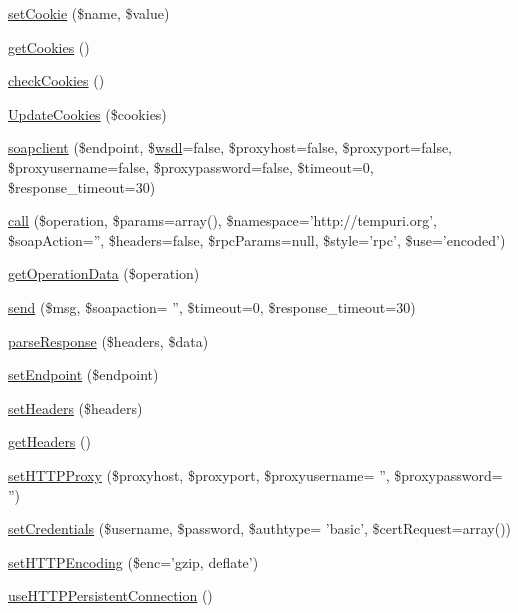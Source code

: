 \begin{DoxyCompactItemize}
\item 
\hyperlink{classsoapclient_a3f05f631ff936a033cae038052d9e7f9}{set\-Cookie} (\$name, \$value)
\item 
\hyperlink{classsoapclient_a374b645410526cbbb498b140242a00ba}{get\-Cookies} ()
\item 
\hyperlink{classsoapclient_a6a8794beffec4a05daa7559ab233875e}{check\-Cookies} ()
\item 
\hyperlink{classsoapclient_ad71447ce0ee50309eea6ce0e12a88e02}{Update\-Cookies} (\$cookies)
\item 
\hyperlink{classsoapclient_a59db1a21560241cf6aa51c813cd22e29}{soapclient} (\$endpoint, \$\hyperlink{classwsdl}{wsdl}=false, \$proxyhost=false, \$proxyport=false, \$proxyusername=false, \$proxypassword=false, \$timeout=0, \$response\-\_\-timeout=30)
\item 
\hyperlink{classsoapclient_a806d1d83f45454caf9c6c361c0a4b0ad}{call} (\$operation, \$params=array(), \$namespace='http\-://tempuri.\-org', \$soap\-Action='', \$headers=false, \$rpc\-Params=null, \$style='rpc', \$use='encoded')
\item 
\hyperlink{classsoapclient_ad66fb2de1dae9b9597bed83de4f343a7}{get\-Operation\-Data} (\$operation)
\item 
\hyperlink{classsoapclient_aece60a5a6bd359481071516aa7024b56}{send} (\$msg, \$soapaction= '', \$timeout=0, \$response\-\_\-timeout=30)
\item 
\hyperlink{classsoapclient_aca1ed2155629bfc242ddea3636ac24c1}{parse\-Response} (\$headers, \$data)
\item 
\hyperlink{classsoapclient_abab265adeddb116a65a24dc0fa1eafb2}{set\-Endpoint} (\$endpoint)
\item 
\hyperlink{classsoapclient_ac1f59fefc1b33175a734321e13b42253}{set\-Headers} (\$headers)
\item 
\hyperlink{classsoapclient_a157e0005d82edaa21cbea07fdc5c62da}{get\-Headers} ()
\item 
\hyperlink{classsoapclient_a52152e7ae9c46863424bbafacf6a7f71}{set\-H\-T\-T\-P\-Proxy} (\$proxyhost, \$proxyport, \$proxyusername= '', \$proxypassword= '')
\item 
\hyperlink{classsoapclient_ada213133d177c1c9c07435d65e89e735}{set\-Credentials} (\$username, \$password, \$authtype= 'basic', \$cert\-Request=array())
\item 
\hyperlink{classsoapclient_a9528927202777242800c394fadc03191}{set\-H\-T\-T\-P\-Encoding} (\$enc='gzip, deflate')
\item 
\hyperlink{classsoapclient_a6558d144faf99ccc9ef4621ffd56bd75}{use\-H\-T\-T\-P\-Persistent\-Connection} ()

\end{DoxyCompactItemize}
